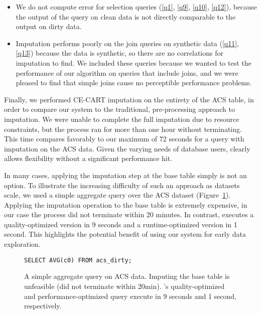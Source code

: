 {\begin{itemize}
\item We do not compute error for selection queries (\ref{q1}, \ref{q9}, \ref{q10}, \ref{q12}), because the output of the query on clean data is not directly comparable to the output on dirty data.

  \item Imputation performs poorly on the join queries on synthetic data (\ref{q11}, \ref{q13}) because the data is synthetic, so there are no correlations for imputation to find. We included these queries because we wanted to test the performance of our algorithm on queries that include joins, and we were pleased to find that simple joins cause no perceptible performance problems.
\end{itemize}

Finally, we performed CE-CART imputation on the entirety of the ACS table, in order to compare our system to the traditional, pre-processing approach to imputation.
We were unable to complete the full imputation due to resource constraints, but the process ran for more than one hour without terminating.
This time compares favorably to our maximum of 72 seconds for a query with imputation on the ACS data.
Given the varying needs of database users, \ProjectName{} clearly allows flexibility without a significant performance hit.
}

In many cases, applying the imputation step at the base table simply is not an option. To illustrate the increasing difficulty of such an approach
as datasets scale, we used a simple aggregate query over the ACS dataset (Figure~\ref{query-acs}). Applying the imputation operation to the base table
is extremely expensive, in our case the process did not terminate within 20 minutes. In contrast, \ProjectName{} executes a quality-optimized version
in 9 seconds and a runtime-optimized version in 1 second. This highlights the potential benefit of using our system for early data exploration.

\begin{figure}
\begin{lstlisting}
SELECT AVG(c0) FROM acs_dirty;
\end{lstlisting}
\caption{A simple aggregate query on ACS data. Imputing the base table is unfeasible (did not terminate within 20min). \ProjectName's
quality-optimized and performance-optimized query execute in 9 seconds and 1 second, respectively.
}
\label{query-acs}
\end{figure}



